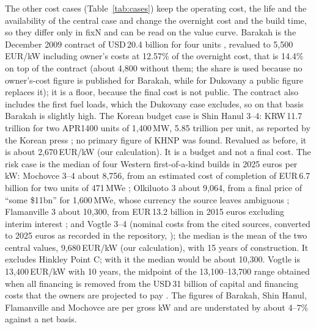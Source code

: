 The other cost cases (Table~\ref{tab:cases}) keep the operating cost, the life and the availability of the central case and change the overnight cost and the build time, so they differ only in fixN and can be read on the value curve. Barakah is the December 2009 contract of USD\,20.4 billion for four units \citep{WNAuae}, revalued to 5{,}500\,EUR/kW including owner's costs at 12.57\% of the overnight cost, that is 14.4\% on top of the contract (about 4{,}800 without them; the share is used because no owner's-cost figure is published for Barakah, while for Dukovany a public figure replaces it); it is a floor, because the final cost is not public. The contract also includes the first fuel loads, which the Dukovany case excludes, so on that basis Barakah is slightly high. The Korean budget case is Shin Hanul 3--4: KRW\,11.7 trillion for two APR1400 units of 1{,}400\,MW, 5.85 trillion per unit, as reported by the Korean press \citep{NewDaily2024}; no primary figure of KHNP was found. Revalued as before, it is about 2{,}670\,EUR/kW (our calculation). It is a budget and not a final cost. The risk case is the median of four Western first-of-a-kind builds in 2025 euros per kW: Mochovce 3--4 about 8{,}756, from an estimated cost of completion of EUR\,6.7 billion for two units of 471\,MWe \citep{WNNMochovce4}; Olkiluoto 3 about 9{,}064, from a final price of ``some \$11bn'' for 1{,}600\,MWe, whose currency the source leaves ambiguous \citep{NEIOL3}; Flamanville 3 about 10{,}300, from EUR\,13.2 billion in 2015 euros excluding interim interest \citep{EDFFlamanville2022}; and Vogtle 3--4 (nominal costs from the cited sources, converted to 2025 euros as recorded in the repository, \citealp{Repo}); the median is the mean of the two central values, 9{,}680\,EUR/kW (our calculation), with 15 years of construction. It excludes Hinkley Point C; with it the median would be about 10{,}300. Vogtle is 13{,}400\,EUR/kW with 10 years, the midpoint of the 13{,}100--13{,}700 range obtained when all financing is removed from the USD\,31 billion of capital and financing costs that the owners are projected to pay \citep{APVogtle2023}. The figures of Barakah, Shin Hanul, Flamanville and Mochovce are per gross kW and are understated by about 4--7\% against a net basis.

